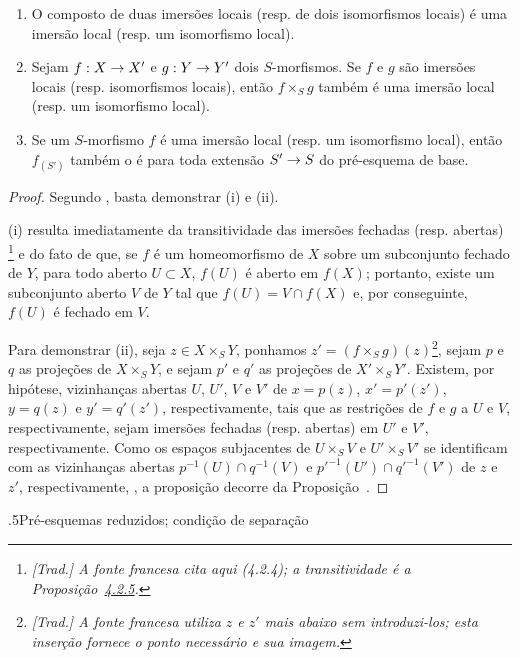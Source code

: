 \documentclass[oneside]{amsart}
\makeatletter
\renewcommand*{\section}{%
  \@startsection{section}{1}{\z@}{.7\linespacing\@plus\linespacing}%
  {.5\linespacing}{\normalfont\bfseries\Large\scshape\centering}}
\newcommand{\ega@arrow}[2]{\mathchoice{#1}{#2}{#2}{#2}}
\renewcommand{\to}{\ega@arrow{\longrightarrow}{\rightarrow}}
\let\EGAOriginalLabel\label
\renewcommand{\label}[1]{\phantomsection\EGAOriginalLabel{#1}}
\makeatother
\begin{document}
\begin{proposition}[4.5.5]
\label{I.4.5.5}
\medskip\noindent
\begin{enumerate}
  \item[{\rm(i)}] O composto de duas imersões locais (resp. de dois isomorfismos locais) é uma imersão local (resp. um isomorfismo local).
  \item[{\rm(ii)}] Sejam $f:X\to X'$ e $g:Y\to Y'$ dois $S$-morfismos.
    Se $f$ e $g$ são imersões locais (resp. isomorfismos locais), então $f\times_S g$ também é uma imersão local (resp. um isomorfismo local).
  \item[{\rm(iii)}] Se um $S$-morfismo $f$ é uma imersão local (resp. um isomorfismo local), então $f_{(S')}$ também o é para toda extensão $S'\to S$ do pré-esquema de base.
\end{enumerate}
\end{proposition}

\begin{proof}
Segundo , basta demonstrar (i) e (ii).

(i) resulta imediatamente da transitividade das imersões fechadas (resp. abertas) \footnote{\emph{[Trad.] A fonte francesa cita aqui (4.2.4); a transitividade é a Proposição~\hyperref[I.4.2.5]{4.2.5}.}} e do fato de que, se $f$ é um homeomorfismo de $X$ sobre um subconjunto fechado de $Y$, para todo aberto $U\subset X$, $f(U)$ é aberto em $f(X)$; portanto, existe um subconjunto aberto $V$ de $Y$ tal que $f(U)=V\cap f(X)$ e, por conseguinte, $f(U)$ é fechado em $V$.

Para demonstrar (ii), seja $z\in X\times_S Y$, ponhamos $z'=(f\times_S g)(z)$\footnote{\emph{[Trad.] A fonte francesa utiliza $z$ e $z'$ mais abaixo sem introduzi-los; esta inserção fornece o ponto necessário e sua imagem.}}, sejam $p$ e $q$ as projeções de $X\times_S Y$, e sejam $p'$ e $q'$ as projeções de $X'\times_S Y'$.
Existem, por hipótese, vizinhanças abertas $U$, $U'$, $V$ e $V'$ de $x=p(z)$, $x'=p'(z')$, $y=q(z)$ e $y'=q'(z')$, respectivamente, tais que as restrições de $f$ e $g$ a $U$ e $V$, respectivamente, sejam imersões fechadas (resp. abertas) em $U'$ e $V'$, respectivamente.
Como os espaços subjacentes de $U\times_S V$ e $U'\times_S V'$ se identificam com as vizinhanças abertas $p^{-1}(U)\cap q^{-1}(V)$ e ${p'}^{-1}(U')\cap{q'}^{-1}(V')$ de $z$ e $z'$, respectivamente, , a proposição decorre da Proposição~.
\end{proof}

\section{Pré-esquemas reduzidos; condição de separação}
\label{section:I.5}
\end{document}
